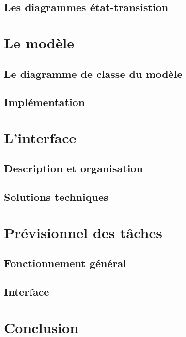 \documentclass[11pt]{report}
\begin{document}
	\section{Les diagrammes état-transistion}

\chapter{Le modèle}

	\section{Le diagramme de classe du modèle}

	\section{Implémentation}

\chapter{L'interface}

	\section{Description et organisation}

	\section{Solutions techniques}

\chapter{Prévisionnel des tâches}

	\section{Fonctionnement général}

	\section{Interface}

\chapter{Conclusion}
\end{document}
